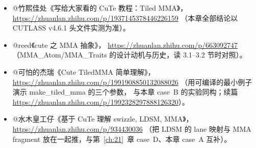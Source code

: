 \begin{itemize}
  \item @竹熙佳处《写给大家看的 CuTe 教程：Tiled MMA》，
        \url{https://zhuanlan.zhihu.com/p/1937145378446226159}
        （本章全部结论以 CUTLASS v4.6.1 头文件实测为准）。
  \item @reed《cute 之 MMA 抽象》，
        \url{https://zhuanlan.zhihu.com/p/663092747}
        （MMA\_Atom/MMA\_Traits 的设计动机与历史，读 3.1--3.2 节时对照）。
  \item @可怕的杰瑞《Cute TiledMMA 简单理解》，
        \url{https://zhuanlan.zhihu.com/p/1991908850132088026}
        （用可编译的最小例子演示 make\_tiled\_mma 的三个参数，
        与本章 case~B 的实验同构；续篇
        \url{https://zhuanlan.zhihu.com/p/1992328297888126320}）。
  \item @水木皇工仔《基于 CuTe 理解 swizzle, LDSM, MMA》，
        \url{https://zhuanlan.zhihu.com/p/934430036}
        （把 LDSM 的 lane 映射与 MMA fragment 放在一起推，与第~\ref{ch:21}~章
        case~D、本章 case~A 互补）。
\end{itemize}
